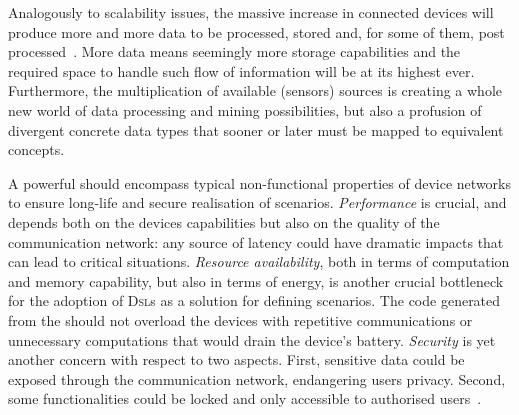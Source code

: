 \begin{description}[leftmargin=0cm]
	\item[Data Management] Analogously to scalability issues, the massive increase in connected devices will produce more and more data to be processed, stored and, for some of them, post processed~\cite{lee-15}. More data means seemingly more storage capabilities and the required space to handle such flow of information will be at its highest ever. Furthermore, the multiplication of available (sensors) sources is creating a whole new world of data processing and mining possibilities, but also a profusion of divergent concrete data types that sooner or later must be mapped to equivalent concepts.
	
	\item[Non-Functional Properties] A powerful \DSL should encompass typical non-functional properties of device networks to ensure long-life and secure realisation of scenarios. \emph{Performance} is crucial, and depends both on the devices capabilities but also on the quality of the communication network: any source of latency could have dramatic impacts that can lead to critical situations. \emph{Resource availability}, both in terms of computation and memory capability, but also in terms of energy, is another crucial bottleneck for the adoption of \textsc{Dsl}s as a solution for defining scenarios. The code generated from the \DSL should not overload the devices with repetitive communications or unnecessary computations that would drain the device's battery. \emph{Security} is yet another concern with respect to two aspects. First, sensitive data could be exposed through the communication network, endangering users privacy. Second, some functionalities could be locked and only accessible to authorised users~\cite{tan-10}.
\end{description}
